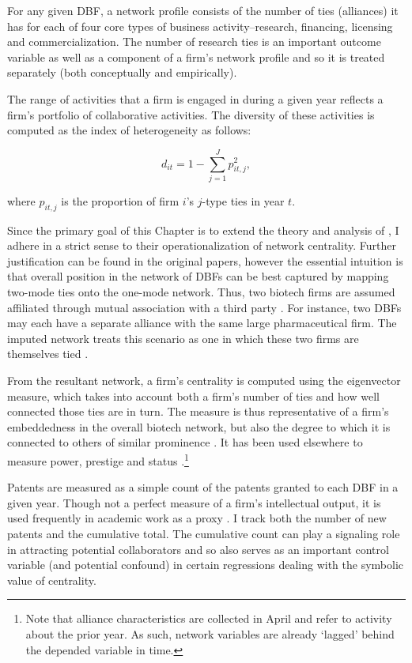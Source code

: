 For any given DBF, a network profile consists of the number of ties (alliances) it has for each of four core types of business activity--research, financing, licensing and commercialization. The number of research ties is an important outcome variable as well as a component of a firm's network profile and so it is treated separately (both conceptually and empirically). 

The range of activities that a firm is engaged in during a given year reflects a firm's portfolio of collaborative activities. The diversity of these activities is computed as the \citet{blau1977} index of heterogeneity as follows: 

\begin{equation}
d_{it}=1-\sum_{j=1}^Jp_{it,j}^2,
\end{equation}

\noindent where $p_{it,j}$ is the proportion of firm $i$'s $j$-type ties in year $t$.
 
Since the primary goal of this Chapter is to extend the theory and analysis of \citet{powell1999}, I adhere in a strict sense to their operationalization of network centrality. Further justification can be found in the original papers, however the essential intuition is that overall position in the network of DBFs can be best captured by mapping two-mode ties onto the one-mode network. Thus, two biotech firms are assumed affiliated through mutual association with a third party \citep[e.g.][]{breiger1974}. For instance, two DBFs may each have a separate alliance with the same large pharmaceutical firm. The imputed network treats this scenario as one in which these two firms are themselves tied \citep[cf.]{powell1996}.

From the resultant network, a firm's centrality is computed using the \citet{bonacich1972} eigenvector measure, which takes into account both a firm's number of ties and how well connected those ties are in turn. The measure is thus representative of a firm's embeddedness in the overall biotech network, but also the degree to which it is connected to others of similar prominence \citep{podolny2001}. It has been used elsewhere to measure power, prestige and status \citep{burt1982, baker1998}.\footnote{Note that alliance characteristics are collected in April and refer to activity about the prior year. As such, network variables are already `lagged' behind the depended variable in time.}

Patents are measured as a simple count of the patents granted to each DBF in a given year. Though not a perfect measure of a firm's intellectual output, it is used frequently in academic work as a proxy \citep[cf.][]{powell1999, trajtenberg1990}. I track both the number of new patents and the cumulative total. The cumulative count can play a signaling role in attracting potential collaborators \citep[e.g.]{smith1998} and so also serves as an important control variable (and potential confound) in certain regressions dealing with the symbolic value of centrality. 

